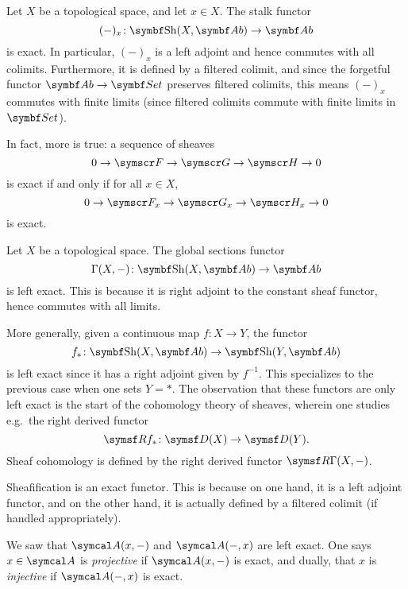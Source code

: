\begin{example}
	Let \(X\) be a topological space, and let \(x\in X\). The stalk functor
	\[ (-)_x\!:\Sh(X,\Ab)\to\Ab \]
	is exact. In particular, \((-)_x\) is a left adjoint and hence commutes with all colimits. Furthermore, it is defined by a filtered colimit, and since the
	forgetful functor \(\Ab\to\Set\) preserves filtered colimits, this means \((-)_x\) commutes with finite limits (since filtered colimits commute with finite limits in \(\Set\)).

	In fact, more is true: a sequence of sheaves
	\[ 0 \to\scrF\to\scrG\to\scrH\to 0 \]
	is exact if and only if for all \(x\in X\),
	\[ 0\to\scrF_x\to\scrG_x\to\scrH_x\to0 \]
	is exact.
\end{example}

\begin{example}
	Let \(X\) be a topological space. The global sections functor
	\[ \Gamma(X,-)\!:\Sh(X,\Ab)\to\Ab \]
	is left exact. This is because it is right adjoint to the constant sheaf functor, hence commutes with all limits.

	More generally, given a continuous map \(f\!:X\to Y\), the functor
	\[ f_*\!:\Sh(X,\Ab)\to\Sh(Y,\Ab) \]
	is left exact since it has a right adjoint given by \(f^{-1}\). This specializes to the previous case when one sets \(Y = *\). The observation
	that these functors are only left exact is the start of the cohomology theory of sheaves, wherein one studies e.g.\ the right derived functor
	\[ \sfR f_*\!:\sfD(X)\to\sfD(Y). \]
	Sheaf cohomology is defined by the right derived functor \(\sfR\Gamma(X,-)\).
\end{example}
\begin{example}
	Sheafification is an exact functor. This is because on one hand, it is a left adjoint functor, and on the other hand, it is actually defined by
	a filtered colimit (if handled appropriately).
\end{example}
\begin{remark}
	We saw that \(\calA(x,-)\) and \(\calA(-,x)\) are left exact. One says \(x\in\calA\) is \emph{projective} if \(\calA(x,-)\) is exact, and dually,
	that \(x\) is \emph{injective} if \(\calA(-,x)\) is exact.
\end{remark}
